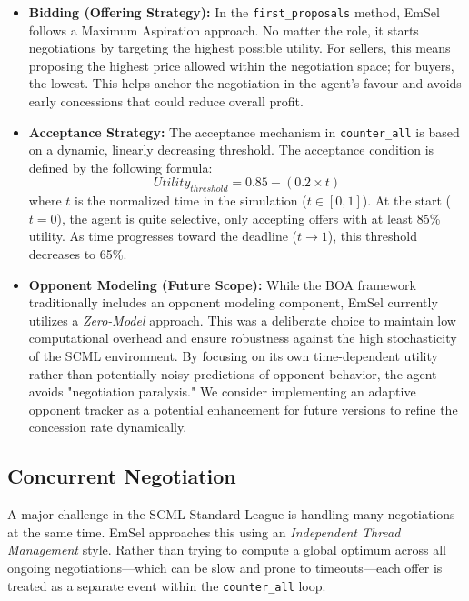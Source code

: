 \documentclass[a4paper,11pt]{article}
\begin{document}
	\begin{itemize}
		\item \textbf{Bidding (Offering Strategy):} In the \texttt{first\_proposals} method, EmSel follows a Maximum Aspiration approach. No matter the role, it starts negotiations by targeting the highest possible utility. For sellers, this means proposing the highest price allowed within the negotiation space; for buyers, the lowest. This helps anchor the negotiation in the agent's favour and avoids early concessions that could reduce overall profit. 
		
		\item \textbf{Acceptance Strategy:} The acceptance mechanism in \texttt{counter\_all} is based on a dynamic, linearly decreasing threshold. The acceptance condition is defined by the following formula:
		\begin{equation}
			Utility_{threshold} = 0.85 - (0.2 \times t)
		\end{equation}
		where $t$ is the normalized time in the simulation ($t \in [0,1]$). At the start ($t = 0$), the agent is quite selective, only accepting offers with at least 85\% utility. As time progresses toward the deadline ($t \to 1$), this threshold decreases to 65\%.
		
		\item \textbf{Opponent Modeling (Future Scope):} While the BOA framework traditionally includes an opponent modeling component, EmSel currently utilizes a \textit{Zero-Model} approach. This was a deliberate choice to maintain low computational overhead and ensure robustness against the high stochasticity of the SCML environment. By focusing on its own time-dependent utility rather than potentially noisy predictions of opponent behavior, the agent avoids "negotiation paralysis." We consider implementing an adaptive opponent tracker as a potential enhancement for future versions to refine the concession rate dynamically.
	\end{itemize}
	
	\subsection{Concurrent Negotiation}
	
	A major challenge in the SCML Standard League is handling many negotiations at the same time. EmSel approaches this using an \textit{Independent Thread Management} style. Rather than trying to compute a global optimum across all ongoing negotiations—which can be slow and prone to timeouts—each offer is treated as a separate event within the \texttt{counter\_all} loop.
	
\end{document}
